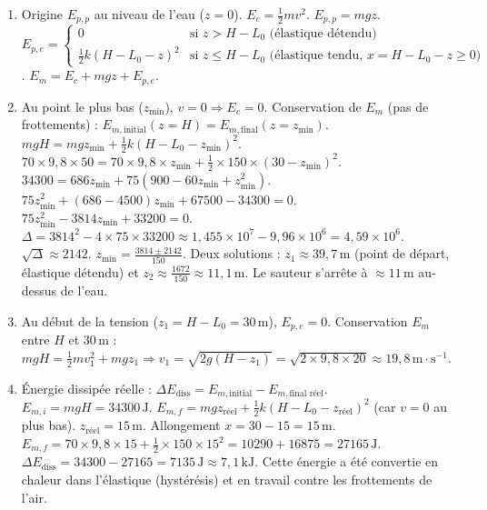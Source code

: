 \documentclass[11pt]{article}
\begin{document}
\begin{corrige}
\begin{enumerate}
    \item Origine $E_{p,p}$ au niveau de l'eau ($z=0$).
        $E_c = \frac{1}{2}mv^2$.
        $E_{p,p} = mgz$.
        $E_{p,e} = \begin{cases} 0 & \text{si } z > H-L_0 \text{ (élastique détendu)} \\ \frac{1}{2}k(H - L_0 - z)^2 & \text{si } z \le H-L_0 \text{ (élastique tendu, } x = H-L_0-z \ge 0) \end{cases}$.
        $E_m = E_c + mgz + E_{p,e}$.
    \item Au point le plus bas ($z_{\text{min}}$), $v=0 \Rightarrow E_c=0$. Conservation de $E_m$ (pas de frottements) :
        $E_{m,\text{initial}}(z=H) = E_{m,\text{final}}(z=z_{\text{min}})$.
        $mgH = mgz_{\text{min}} + \frac{1}{2}k(H - L_0 - z_{\text{min}})^2$.
        $70 \times 9,8 \times 50 = 70 \times 9,8 \times z_{\text{min}} + \frac{1}{2} \times 150 \times (30 - z_{\text{min}})^2$.
        $34300 = 686 z_{\text{min}} + 75 (900 - 60 z_{\text{min}} + z_{\text{min}}^2)$.
        $75 z_{\text{min}}^2 + (686 - 4500) z_{\text{min}} + 67500 - 34300 = 0$.
        $75 z_{\text{min}}^2 - 3814 z_{\text{min}} + 33200 = 0$.
        $\Delta = 3814^2 - 4 \times 75 \times 33200 \approx 1,455 \times 10^7 - 9,96 \times 10^6 = 4,59 \times 10^6$.
        $\sqrt{\Delta} \approx 2142$.
        $z_{\text{min}} = \frac{3814 \pm 2142}{150}$.
        Deux solutions : $z_1 \approx 39,7\,\text{m}$ (point de départ, élastique détendu) et $z_2 \approx \frac{1672}{150} \approx \boxed{11,1\,\text{m}}$.
        Le sauteur s'arrête à $\approx 11\,\text{m}$ au-dessus de l'eau.
    \item Au début de la tension ($z_1 = H - L_0 = 30\,\text{m}$), $E_{p,e}=0$. Conservation $E_m$ entre $H$ et $30\,\text{m}$ :
        $mgH = \frac{1}{2}mv_1^2 + mgz_1 \Rightarrow v_1 = \sqrt{2g(H-z_1)} = \sqrt{2 \times 9,8 \times 20} \approx \boxed{19,8\,\text{m}\!\cdot\!\text{s}^{-1}}$.
    \item Énergie dissipée réelle : $\Delta E_{\text{diss}} = E_{m,\text{initial}} - E_{m,\text{final réel}}$.
        $E_{m,i} = mgH = 34300\,\text{J}$.
        $E_{m,f} = mgz_{\text{réel}} + \frac{1}{2}k(H-L_0-z_{\text{réel}})^2$ (car $v=0$ au plus bas).
        $z_{\text{réel}} = 15\,\text{m}$. Allongement $x = 30 - 15 = 15\,\text{m}$.
        $E_{m,f} = 70 \times 9,8 \times 15 + \frac{1}{2} \times 150 \times 15^2 = 10290 + 16875 = 27165\,\text{J}$.
        $\Delta E_{\text{diss}} = 34300 - 27165 = \boxed{7135\,\text{J}} \approx 7,1\,\text{kJ}$.
        Cette énergie a été convertie en chaleur dans l'élastique (hystérésis) et en travail contre les frottements de l'air.
\end{enumerate}
\end{corrige}
\end{document}
